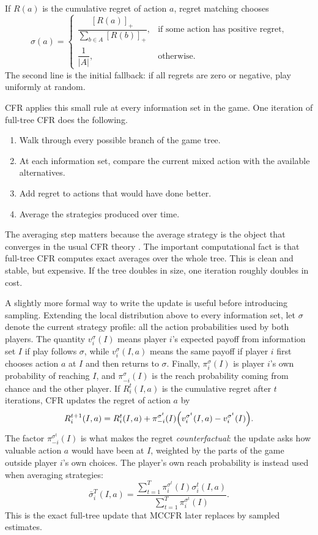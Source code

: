 \documentclass[11pt,reqno,twoside]{article}
\theoremstyle{myThm}
\theoremstyle{myRem}
\theoremstyle{myDef}
\let\originalleft\left
\let\originalright\right
\renewcommand{\left}{\mathopen{}\mathclose\bgroup\originalleft}
\renewcommand{\right}{\aftergroup\egroup\originalright}
\numberwithin{equation}{section}
\begin{document}
If $R(a)$ is the cumulative regret of action $a$, regret matching chooses
\[
\sigma(a)
=
\begin{cases}
\dfrac{[R(a)]_+}{\sum_{b \in A}[R(b)]_+},
& \text{if some action has positive regret}, \\[1.2ex]
\dfrac{1}{|A|},
& \text{otherwise}.
\end{cases}
\]
The second line is the initial fallback: if all regrets are zero or
negative, play uniformly at random.

CFR applies this small rule at every information set in the game. One
iteration of full-tree CFR does the following.
\begin{enumerate}
\item Walk through every possible branch of the game tree.
\item At each information set, compare the current mixed action with the
available alternatives.
\item Add regret to actions that would have done better.
\item Average the strategies produced over time.
\end{enumerate}

The averaging step matters because the average strategy is the object that
converges in the usual CFR theory \cite{zinkevich2007}. The important
computational fact is that full-tree CFR computes exact averages over the
whole tree. This is clean and stable, but expensive. If the tree doubles
in size, one iteration roughly doubles in cost.

A slightly more formal way to write the update is useful before introducing
sampling. Extending the local distribution above to every information set,
let $\sigma$ denote the current strategy profile: all the action probabilities
used by both players. The quantity $v_i^\sigma(I)$ means player $i$'s expected
payoff from information set $I$ if play follows $\sigma$, while
$v_i^\sigma(I,a)$ means the same payoff if player $i$ first chooses action $a$
at $I$ and then returns to $\sigma$. Finally, $\pi_i^\sigma(I)$ is player
$i$'s own probability of reaching $I$, and $\pi_{-i}^\sigma(I)$ is the reach
probability coming from chance and the other player. If $R_i^t(I,a)$ is the
cumulative regret after $t$ iterations, CFR updates the regret of action $a$
by
\[
R_i^{t+1}(I,a)
=
R_i^t(I,a)
+
\pi_{-i}^{\sigma^t}(I)
\left(
v_i^{\sigma^t}(I,a)-v_i^{\sigma^t}(I)
\right).
\]
The factor $\pi_{-i}^{\sigma^t}(I)$ is what makes the regret
\emph{counterfactual}: the update asks how valuable action $a$ would have
been at $I$, weighted by the parts of the game outside player $i$'s own
choices. The player's own reach probability is instead used when averaging
strategies:
\[
\bar{\sigma}_i^T(I,a)
=
\frac{\sum_{t=1}^T \pi_i^{\sigma^t}(I)\sigma_i^t(I,a)}
{\sum_{t=1}^T \pi_i^{\sigma^t}(I)}.
\]
This is the exact full-tree update that MCCFR later replaces by sampled
estimates.
\end{document}
